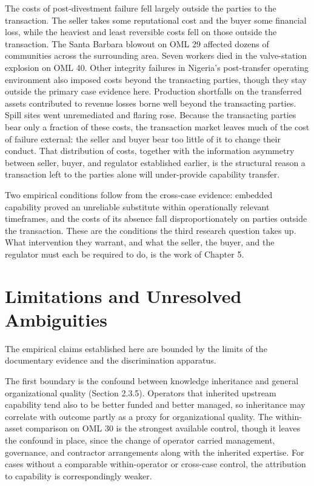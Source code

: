 \documentclass[twoside,fontset=lmodern]{mitthesis}
\begin{document}
The costs of post-divestment failure fell largely outside the parties to
the transaction. The seller takes some reputational cost and the buyer
some financial loss, while the heaviest and least reversible costs fell
on those outside the transaction. The Santa Barbara blowout on OML 29
affected dozens of communities across the surrounding area. Seven
workers died in the valve-station explosion on OML 40. Other integrity
failures in Nigeria's post-transfer operating environment also imposed
costs beyond the transacting parties, though they stay outside the
primary case evidence here. Production shortfalls on the transferred
assets contributed to revenue losses borne well beyond the transacting
parties. Spill sites went unremediated and flaring rose. Because the
transacting parties bear only a fraction of these costs, the transaction
market leaves much of the cost of failure external: the seller and buyer
bear too little of it to change their conduct. That distribution of
costs, together with the information asymmetry between seller, buyer,
and regulator established earlier, is the structural reason a
transaction left to the parties alone will under-provide capability
transfer.

Two empirical conditions follow from the cross-case evidence: embedded
capability proved an unreliable substitute within operationally relevant
timeframes, and the costs of its absence fall disproportionately on
parties outside the transaction. These are the conditions the third
research question takes up. What intervention they warrant, and what the
seller, the buyer, and the regulator must each be required to do, is the
work of Chapter 5.

\hypertarget{limitations-and-unresolved-ambiguities}{%
\section{Limitations and Unresolved
Ambiguities}\label{limitations-and-unresolved-ambiguities}}

The empirical claims established here are bounded by the limits of the
documentary evidence and the discrimination apparatus.

The first boundary is the confound between knowledge inheritance and
general organizational quality (Section 2.3.5). Operators that inherited
upstream capability tend also to be better funded and better managed, so
inheritance may correlate with outcome partly as a proxy for
organizational quality. The within-asset comparison on OML 30 is the
strongest available control, though it leaves the confound in place,
since the change of operator carried management, governance, and
contractor arrangements along with the inherited expertise. For cases
without a comparable within-operator or cross-case control, the
attribution to capability is correspondingly weaker.
\end{document}
